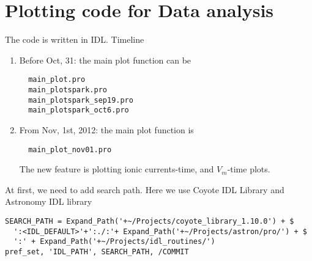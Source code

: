 \chapter{Plotting code for Data analysis}

The code is written in IDL. Timeline
\begin{enumerate}
  \item Before Oct, 31: the main plot function can be 
  \begin{verbatim}
  main_plot.pro
  main_plotspark.pro
  main_plotspark_sep19.pro
  main_plotspark_oct6.pro
  \end{verbatim}
  \item From Nov, 1st, 2012: the main plot function is 
  \begin{verbatim}
  main_plot_nov01.pro
  \end{verbatim}
  The new feature is plotting ionic currents-time, and $V_m$-time plots.
\end{enumerate}

At first, we need to add search path. Here we use Coyote IDL Library and
Astronomy IDL library
\begin{verbatim}
SEARCH_PATH = Expand_Path('+~/Projects/coyote_library_1.10.0') + $
  ':<IDL_DEFAULT>'+':./:'+ Expand_Path('+~/Projects/astron/pro/') + $ 
  ':' + Expand_Path('+~/Projects/idl_routines/') 
pref_set, 'IDL_PATH', SEARCH_PATH, /COMMIT
\end{verbatim}


